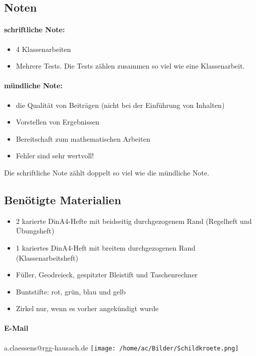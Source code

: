 \documentclass[a5paper,12pt]{scrartcl}
\begin{document}
\subsection*{Noten}
\paragraph{schriftliche Note:}
\begin{itemize}
	\item 4 Klassenarbeiten
	\item Mehrere Tests. Die Tests zählen zusammen so viel wie eine Klassenarbeit.
\end{itemize}
\paragraph{mündliche Note:}
\begin{itemize}
	\item die Qualität von Beiträgen (nicht bei der Einführung von Inhalten)
	\item Vorstellen von Ergebnissen
	\item Bereitschaft zum mathematischen Arbeiten
	\item Fehler sind sehr wertvoll!
\end{itemize}
	Die schriftliche Note zählt doppelt so viel wie die mündliche Note.
\subsection*{Benötigte Materialien}
\begin{itemize}
	\item 2 karierte DinA4-Hefte mit beidseitig durchgezogenem Rand (Regelheft und Übungsheft)
	\item 1 kariertes DinA4-Heft mit breitem durchgezogenen Rand (Klassenarbeitsheft)
	\item Füller, Geodreieck, gespitzter Bleistift und Taschenrechner
	\item Buntstifte: rot, grün, blau und gelb
	\item Zirkel nur, wenn es vorher angekündigt wurde
\end{itemize}
\paragraph{E-Mail} a.claessens@rgg-hausach.de
	\flushright\texttt{[image: /home/ac/Bilder/Schildkroete.png]}
\end{document}
